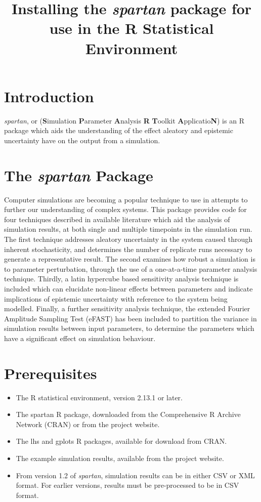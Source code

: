 \documentclass[a4paper,11pt]{article}
\title{\huge \textbf{Installing the \textit{spartan} package for use in the R Statistical Environment}\\
\date{}
}
\begin{document}
\maketitle


\section{Introduction}
\noindent \textit{spartan}, or (\textbf{S}imulation \textbf{P}arameter \textbf{A}nalysis \textbf{R} \textbf{T}oolkit \textbf{A}pplicatio\textbf{N}) is an R package which aids the understanding of the effect aleatory and epistemic uncertainty have on the output from a simulation. 

\section{The \textit{spartan} Package}
\noindent Computer simulations are becoming a popular technique to use in attempts to further our understanding of complex systems. This package provides code for four techniques described in available literature which aid the analysis of simulation results, at both single and multiple timepoints in the simulation run. The first technique addresses aleatory uncertainty in the system caused through inherent stochasticity, and determines the number of replicate runs necessary to generate a representative result. The second examines how robust a simulation is to parameter perturbation, through the use of a one-at-a-time parameter analysis technique. Thirdly, a latin hypercube based sensitivity analysis technique is included which can elucidate non-linear effects between parameters and indicate implications of epistemic uncertainty with reference to the system being modelled. Finally, a further sensitivity analysis technique, the extended Fourier Amplitude Sampling Test (eFAST) has been included to partition the variance in simulation results between input parameters, to determine the parameters which have a significant effect on simulation behaviour.

\section{Prerequisites}
\begin{itemize}
\item The R statistical environment, version 2.13.1 or later.
\item The spartan R package, downloaded from the Comprehensive R Archive Network (CRAN) or from the project website.
\item The lhs and gplots R packages, available for download from CRAN.
\item The example simulation results, available from the project website.
\item From version 1.2 of \textit{spartan}, simulation results can be in either CSV or XML format. For earlier versions, results must be pre-processed to be in CSV format.
\end{itemize}
\end{document}
